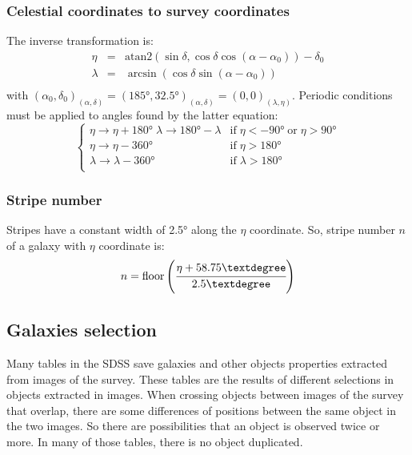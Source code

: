 \subsubsection{Celestial coordinates to survey coordinates}

The inverse transformation is:
%
\begin{eqnarray}
    \eta &=&
        \mathrm{atan2}
        \left(\sin\delta,\cos\delta\cos\left(\alpha-\alpha_0\right)\right)-
            \delta_0\nonumber\\
    \lambda &=&
        \arcsin\left(\cos\delta\sin\left(\alpha-\alpha_0\right)\right)
            \nonumber\\
\end{eqnarray}
%
with ${\left(\alpha_0,\delta_0\right)}_{\left(\alpha,\delta\right)}=
{\left(185°,32.5°\right)}_{\left(\alpha,\delta\right)}=
{\left(0,0\right)}_{\left(\lambda,\eta\right)}$. Periodic conditions must be
applied to angles found by the latter equation:
%
\begin{equation}
    \begin{cases}
        \eta\rightarrow\eta+180° \; \lambda\rightarrow180°-\lambda&
        \mbox{if}\;\eta<-90°\;\mbox{or}\; \eta>90°\\
        \eta\rightarrow\eta-360° &
        \mbox{if}\;\eta>180°\\
        \lambda\rightarrow\lambda-360° &
        \mbox{if}\;\lambda>180°\\
    \end{cases}
\end{equation}
%
\subsubsection{Stripe number}
%
Stripes have a constant width of 2.5° along the $\eta$ coordinate. So,
stripe number $n$ of a galaxy with $\eta$ coordinate is:
%
\begin{equation}
    n = \mathrm{floor}\left(\cfrac{\eta+58.75°}{2.5°}\right)
\end{equation}
%
\subsection{Galaxies selection}
%
Many tables in the SDSS save galaxies and other objects properties extracted
from images of the survey. These tables are the results of different
selections in objects extracted in images. When crossing objects between
images of the survey that overlap, there are some differences of positions
between the same object in the two images. So there are possibilities that
an object is observed twice or more. In many of those tables, there is no
object duplicated.

